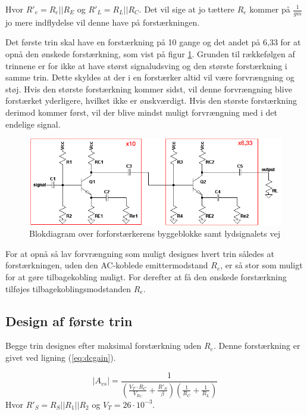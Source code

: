 Hvor $R'_e = R_e || R_E$ og $R'_L = R_L||R_C$. Det vil sige at jo tættere $R_e$ kommer på $\frac{1}{gm}$ jo mere indflydelse vil denne have på forstærkningen.

Det første trin skal have en forstærkning på 10 gange og det andet på 6,33 for at opnå den ønskede forstærkning, som vist på figur \ref{blok_forforstaerker}. Grunden til rækkefølgen af trinnene er for ikke at have størst signaludsving og den største forstærkning i samme trin. Dette skyldes at der i en forstærker altid vil være forvrængning og støj. Hvis den største forstærkning kommer sidst, vil denne forvrængning blive forstærket yderligere, hvilket ikke er ønskværdigt. Hvis den største forstærkning derimod kommer først, vil der blive mindst muligt forvrængning med i det endelige signal.

\begin{figure}[h]
\centering
\includegraphics[scale=.6]{teknisk/forforstaerker/blok_forforstaerker.png}
\caption{Blokdiagram over forforstærkerens byggeblokke samt lydsignalets vej}
\label{blok_forforstaerker}
\end{figure}

For at opnå så lav forvrængning som muligt designes hvert trin således at forstærkningen, uden den AC-koblede emittermodstand $R_e$, er så stor som muligt for at gøre tilbagekobling muligt. For derefter at få den ønskede forstærkning tilføjes tilbagekoblingsmodstanden $R_e$.

\subsection*{Design af første trin}
Begge trin designes efter maksimal forstærkning uden $R_e$. Denne forstærkning er givet ved ligning (\ref{eq:dcgain}).

\begin{equation}
|A_{vs}|=\frac{1}{\left(\frac{V_T \cdot R_C}{V_{R_C}}+\frac{R'_S}{\beta}\right) \left(\frac{1}{R_C}+\frac{1}{R_L}\right)}
\label{eq:dcgain}
\end{equation}
Hvor $R'_S = R_S||R_1||R_2$ og $V_T = 26 \cdot 10^{-3}$.

